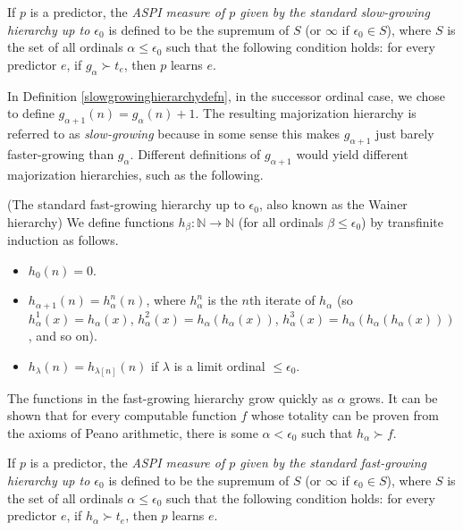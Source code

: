 \documentclass[twoside,11pt]{article}
\begin{document}
\begin{definition}
\label{tradmajorizationhierarchyhibbardmeasuredefn}
    If $p$ is a predictor, the \emph{ASPI measure of $p$ given by the
    standard slow-growing hierarchy up to $\epsilon_0$} is defined to be the
    supremum of $S$ (or $\infty$
    if $\epsilon_0\in S$), where $S$ is the set of all ordinals
    $\alpha\leq\epsilon_0$
    such that the following condition holds:
    for every predictor $e$, if $g_\alpha\succ t_e$, then $p$ learns $e$.
\end{definition}

In Definition \ref{slowgrowinghierarchydefn}, in the successor ordinal case,
we chose to define $g_{\alpha+1}(n)=g_\alpha(n)+1$. The resulting majorization
hierarchy is referred to as \emph{slow-growing} because in some sense this
makes $g_{\alpha+1}$ just barely faster-growing than $g_\alpha$.
Different definitions of $g_{\alpha+1}$ would yield different majorization
hierarchies, such as the following.

\begin{definition}
\label{fastgrowinghierarchydefn}
    (The standard fast-growing hierarchy up to $\epsilon_0$, also known as
    the Wainer hierarchy)
    We define functions $h_\beta:\mathbb N\to\mathbb N$ (for all ordinals
    $\beta\leq \epsilon_0$) by transfinite induction as follows.
    \begin{itemize}
        \item
        $h_0(n)=0$.
        \item
        $h_{\alpha+1}(n) = h^n_\alpha(n)$, where $h^n_\alpha$ is the $n$th
        iterate of $h_\alpha$ (so $h^1_\alpha(x)=h_\alpha(x)$,
        $h^2_\alpha(x)=h_\alpha(h_\alpha(x))$,
        $h^3_\alpha(x)=h_\alpha(h_\alpha(h_\alpha(x)))$, and so on).
        \item
        $h_{\lambda}(n) = h_{\lambda[n]}(n)$ if $\lambda$ is a
        limit ordinal $\leq\epsilon_0$.
    \end{itemize}
\end{definition}

The functions in the fast-growing hierarchy grow quickly
as $\alpha$ grows. It can be shown \citep{wainer1987provably} that
for every computable function $f$ whose totality can be proven from the axioms of
Peano arithmetic, there is some $\alpha<\epsilon_0$ such that $h_\alpha\succ f$.

\begin{definition}
\label{fastmajorizationhierarchyhibbardmeasuredefn}
    If $p$ is a predictor, the \emph{ASPI measure of $p$ given by the
    standard fast-growing hierarchy up to $\epsilon_0$} is defined to be the
    supremum of $S$ (or $\infty$ if $\epsilon_0\in S$),
    where $S$ is the set of all ordinals $\alpha\leq\epsilon_0$ such that
    the following condition holds:
    for every predictor $e$, if $h_\alpha\succ t_e$, then $p$ learns $e$.
\end{definition}
\end{document}
